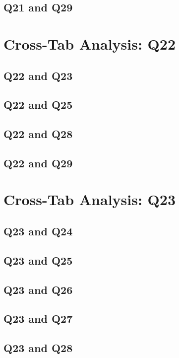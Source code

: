 \documentclass{report}
\begin{document}
\section{Q21 and Q29}\clearpage

\chapter{Cross-Tab Analysis: Q22}

\section{Q22 and Q23}\clearpage
\section{Q22 and Q25}\clearpage
\section{Q22 and Q28}\clearpage
\section{Q22 and Q29}\clearpage

\chapter{Cross-Tab Analysis: Q23}

\section{Q23 and Q24}\clearpage
\section{Q23 and Q25}\clearpage
\section{Q23 and Q26}\clearpage
\section{Q23 and Q27}\clearpage
\section{Q23 and Q28}\clearpage
\end{document}
